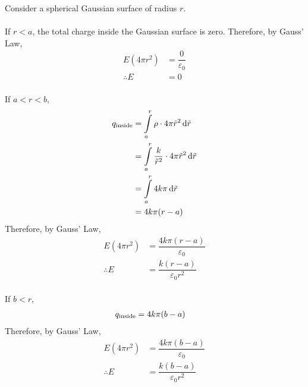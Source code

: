 \documentclass[fleqn, a4paper, 12pt, oneside]{amsart}
\theoremstyle{definition}
\theoremstyle{theorem}
\begin{document}
\begin{solution}
	\begin{figure}[H]
	\end{figure}
	Consider a spherical Gaussian surface of radius $r$.\\
	~\\
	If $r < a$, the total charge inside the Gaussian surface is zero.
	Therefore, by Gauss' Law,
	\begin{align*}
		E (4 \pi r^2) &= \dfrac{0}{\varepsilon_0}\\
		\therefore E &= 0
	\end{align*}
	~\\
	If $a < r < b$,
	\begin{align*}
		q_{\textnormal{inside}} &= \int\limits_{a}^{r} \rho \cdot 4 \pi {\tilde{r}}^2 \dif \tilde{r}\\
		&= \int\limits_{a}^{r} \dfrac{k}{{\tilde{r}}^2} \cdot 4 \pi {\tilde{r}}^2 \dif \tilde{r}\\
		&= \int\limits_{a}^{r} 4 k \pi \dif \tilde{r}\\
		&= 4 k \pi (r - a)
	\end{align*}
	Therefore, by Gauss' Law,
	\begin{align*}
		E (4 \pi r^2) &= \dfrac{4 k \pi (r - a)}{\varepsilon_0}\\
		\therefore E &= \dfrac{k (r - a)}{\varepsilon_0 r^2}
	\end{align*}
	~\\
	If $b < r$,
	\begin{align*}
		q_{\textnormal{inside}} &= 4 k \pi (b - a)
	\end{align*}
	Therefore, by Gauss' Law,
	\begin{align*}
		E (4 \pi r^2) &= \dfrac{4 k \pi (b - a)}{\varepsilon_0}\\
		\therefore E &= \dfrac{k (b - a)}{\varepsilon_0 r^2}
	\end{align*}
	~\\
	\begin{figure}[H]
	\end{figure}
\end{solution}
\end{document}
